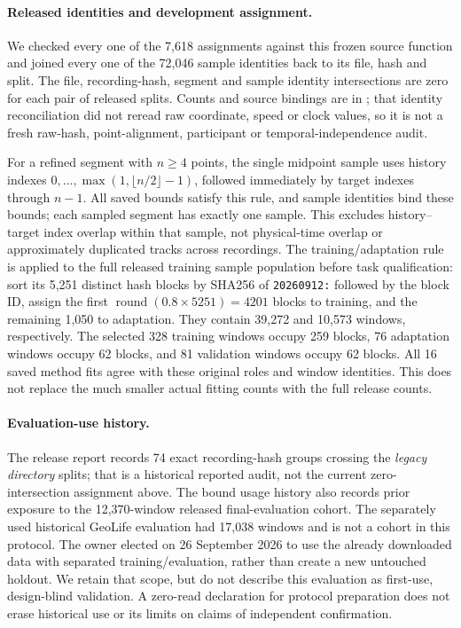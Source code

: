 \paragraph{Released identities and development assignment.}
We checked every one of the 7,618 assignments against this frozen source
function and joined every one of the 72,046 sample identities back to its
file, hash and split. The file, recording-hash, segment and sample identity
intersections are zero for each pair of released splits. Counts and source
bindings are in ; that identity
reconciliation did not reread raw coordinate, speed or clock values, so it is not a fresh raw-hash,
point-alignment, participant or temporal-independence audit.

For a refined segment with \(n\geq4\) points, the single midpoint sample uses
history indexes \(0,\ldots,\max(1,\lfloor n/2\rfloor-1)\), followed immediately
by target indexes through \(n-1\). All saved bounds satisfy this rule, and
sample identities bind these bounds; each sampled segment has exactly one
sample. This excludes history--target index overlap within that sample, not
physical-time overlap or approximately duplicated tracks across recordings.
The training/adaptation rule is applied to the full released training
sample population before task qualification: sort its 5,251 distinct hash
blocks by SHA256 of \texttt{20260912:} followed by the block ID, assign the
first \(\operatorname{round}(0.8\times5251)=4201\) blocks to training, and the
remaining 1,050 to adaptation. They contain 39,272 and 10,573 windows,
respectively. The selected 328 training windows occupy 259 blocks, 76
adaptation windows occupy 62 blocks, and 81 validation windows occupy 62
blocks. All 16 saved method fits agree with these original roles and window
identities. This does not replace the much smaller actual fitting counts
with the full release counts.

\paragraph{Evaluation-use history.}
The release report records 74 exact recording-hash groups crossing the
\emph{legacy directory} splits; that is a historical reported audit, not the
current zero-intersection assignment above. The bound usage history also
records prior exposure to the 12,370-window released final-evaluation cohort.
The separately used historical GeoLife evaluation had 17,038 windows and is
not a cohort in this protocol. The owner elected on 26 September 2026 to use
the already downloaded data with separated training/evaluation, rather than
create a new untouched holdout. We retain that scope, but do not describe
this evaluation as first-use, design-blind validation. A zero-read declaration
for protocol preparation does not erase historical use or its limits on
claims of independent confirmation.

